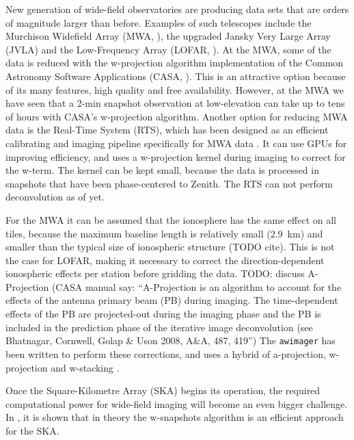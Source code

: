 \documentclass[useAMS,usenatbib]{mn2e}
\begin{document}
New generation of wide-field observatories are producing data sets that are orders of magnitude larger than before. Examples of such telescopes include the Murchison Widefield Array (MWA, \citealt{mwa}), the upgraded Jansky Very Large Array (JVLA) and the Low-Frequency Array (LOFAR, \citealt{lofar-2013}). At the MWA, some of the data is reduced with the w-projection algorithm implementation of the Common Astronomy Software Applications (CASA, \citealt{casa}). This is an attractive option because of its many features, high quality and free availability. However, at the MWA we have seen that a 2-min snapshot observation at low-elevation can take up to tens of hours with CASA's w-projection algorithm. Another option for reducing MWA data is the Real-Time System (RTS), which has been designed as an efficient calibrating and imaging pipeline specifically for MWA data \citep{rts-mwa}. It can use GPUs for improving efficiency, and uses a w-projection kernel during imaging to correct for the w-term. The kernel can be kept small, because the data is processed in snapshots that have been phase-centered to Zenith. The RTS can not perform deconvolution as of yet.

For the MWA it can be assumed that the ionosphere has the same effect on all tiles, because the maximum baseline length is relatively small (2.9~km) and smaller than the typical size of ionospheric structure (TODO cite). This is not the case for LOFAR, making it necessary to correct the direction-dependent ionospheric effects per station before gridding the data. TODO: discuss A-Projection (CASA manual say: ``A-Projection is an algorithm to account for the effects of the antenna primary beam (PB) during imaging. The time-dependent effects of the PB are projected-out during the imaging phase and the PB is included in the prediction phase of the iterative image deconvolution (see Bhatnagar, Cornwell, Golap \& Uson 2008, A\&A, 487, 419'') The \texttt{awimager} has been written to perform these corrections, and uses a hybrid of a-projection, w-projection and w-stacking \citep{awimager-2013}.

Once the Square-Kilometre Array (SKA) begins its operation, the required computational power for wide-field imaging will become an even bigger challenge. In \citet{widefield-imaging-ska-cornwell}, it is shown that in theory the w-snapshots algorithm is an efficient approach for the SKA.
\end{document}
